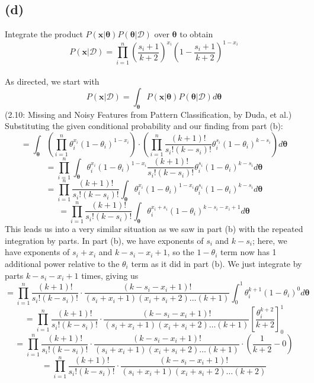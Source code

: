 \documentclass{article}
\begin{document}
{\subsection*{(d)}
Integrate the product \(P(\mathbf{x} | \boldsymbol{\theta}) P(\boldsymbol{\theta} | \mathcal{D})\) over \(\boldsymbol{\theta}\) to obtain 
\[
  P(\mathbf{x} | \mathcal{D}) = \prod_{i=1}^{n} (\frac{s_i + 1}{k + 2})^{x_i} (1 - \frac{s_i + 1}{k + 2})^{1 - x_i}
\] \\
As directed, we start with
\[
  P(\mathbf{x} | \mathcal{D}) = \int_{\boldsymbol{\theta}} P(\mathbf{x} | \boldsymbol{\theta}) P(\boldsymbol{\theta} | \mathcal{D}) d \boldsymbol{\theta}
\]
(2.10: Missing and Noisy Features from Pattern Classification, by Duda, et al.) Substituting the given conditional probability and our finding from part (b):
\[
  = \int_{\boldsymbol{\theta}} (\prod_{i=1}^{n} \theta_i^{x_i} (1 - \theta_i)^{1 - x_i}) \cdot 
  (\prod_{i=1}^{n} \frac{(k+1)!}{s_i!(k - s_i)!} \theta_i^{s_i} (1 - \theta_i)^{k - s_i}) d \boldsymbol{\theta}
\]
\[
  = \prod_{i=1}^{n} \int_{\boldsymbol{\theta}} \theta_i^{x_i} (1 - \theta_i)^{1 - x_i} \frac{(k+1)!}{s_i!(k - s_i)!} \theta_i^{s_i} (1 - \theta_i)^{k - s_i} d \boldsymbol{\theta}
\]
\[
  = \prod_{i=1}^{n} \frac{(k+1)!}{s_i!(k - s_i)!} \int_{\boldsymbol{\theta}} \theta_i^{x_i} (1 - \theta_i)^{1 - x_i} \theta_i^{s_i} (1 - \theta_i)^{k - s_i} d \boldsymbol{\theta}
\]
\[
  = \prod_{i=1}^{n} \frac{(k+1)!}{s_i!(k - s_i)!} \int_{\boldsymbol{\theta}} \theta_i^{x_i + s_i} (1 - \theta_i)^{k - s_ i - x_i + 1} d \boldsymbol{\theta} 
\]
This leads us into a very similar situation as we saw in part (b) with the repeated integration by parts. In part (b), we have exponents of \(s_i\) and \(k - s_i\); here, we have exponents of \(s_i + x_i\) and \(k - s_i - x_i + 1\), so the \(1 - \theta_i\) term now has 1 additional power relative to the \(\theta_i\) term as it did in part (b). We just integrate by parts \(k - s_i - x_i + 1\) times, giving us 
\[
  = \prod_{i=1}^{n} \frac{(k+1)!}{s_i!(k - s_i)!} \cdot \frac{(k - s_i - x_i + 1)!}{(s_i + x_i + 1) (x_i + s_i + 2) \dots (k + 1)} \int_{0}^{1} \theta_i^{k+1} (1 - \theta_i)^{0} d \boldsymbol{\theta} 
\]
\[
  = \prod_{i=1}^{n} \frac{(k+1)!}{s_i!(k - s_i)!} \cdot \frac{(k - s_i - x_i + 1)!}{(s_i + x_i + 1) (x_i + s_i + 2) \dots (k + 1)} [\frac{\theta_i^{k+2}}{k+2}]_0^{1} 
\]
\[
  = \prod_{i=1}^{n} \frac{(k+1)!}{s_i!(k - s_i)!} \cdot \frac{(k - s_i - x_i + 1)!}{(s_i + x_i + 1) (x_i + s_i + 2) \dots (k + 1)} \cdot (\frac{1}{k+2} - 0)
\]
\[
  = \prod_{i=1}^{n} \frac{(k+1)!}{s_i!(k - s_i)!} \cdot \frac{(k - s_i - x_i + 1)!}{(s_i + x_i + 1) (x_i + s_i + 2) \dots (k + 2)}
\]}
\end{document}
